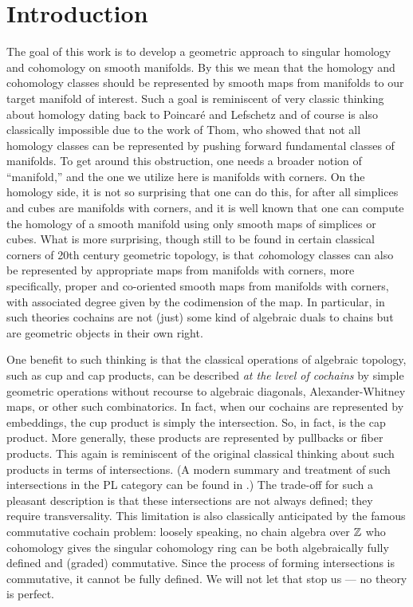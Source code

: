 
\section{Introduction}\label{intro}

The goal of this work is to develop a geometric approach to singular homology and cohomology on smooth manifolds.
By this we mean that the homology and cohomology classes should be represented by smooth maps from manifolds to our target manifold of interest.
Such a goal is reminiscent of very classic thinking about homology dating back to Poincar\'e and Lefschetz and of course is also classically impossible due to the work of Thom, who showed that not all homology classes can be represented by pushing forward fundamental classes of manifolds.
To get around this obstruction, one needs a broader notion of ``manifold,'' and the one we utilize here is manifolds with corners.
On the homology side, it is not so surprising that one can do this, for after all simplices and cubes are manifolds with corners, and it is well known that one can compute the homology of a smooth manifold using only smooth maps of simplices or cubes.
What is more surprising, though still to be found in certain classical corners of 20th century geometric topology, is that \textit{co}homology classes can also be represented by appropriate maps from manifolds with corners, more specifically, proper and co-oriented smooth maps from manifolds with corners, with associated degree given by the codimension of the map.
In particular, in such theories cochains are not (just) some kind of algebraic duals to chains but are geometric objects in their own right.

One benefit to such thinking is that the classical operations of algebraic topology, such as cup and cap products, can be described \textit{at the level of cochains} by simple geometric operations without recourse to algebraic diagonals, Alexander-Whitney maps, or other such combinatorics.
In fact, when our cochains are represented by embeddings, the cup product is simply the intersection.
So, in fact, is the cap product.
More generally, these products are represented by pullbacks or fiber products.
This again is reminiscent of the original classical thinking about such products in terms of intersections.
(A modern summary and treatment of such intersections in the PL category can be found in \cite{McC06}.)
The trade-off for such a pleasant description is that these intersections are not always defined; they require transversality.
This limitation is also classically anticipated by the famous commutative cochain problem: loosely speaking, no chain algebra over $\mathbb{Z}$ who cohomology gives the singular cohomology ring can be both algebraically fully defined and (graded) commutative.
Since the process of forming intersections is commutative, it cannot be fully defined.
We will not let that stop us --- no theory is perfect.

